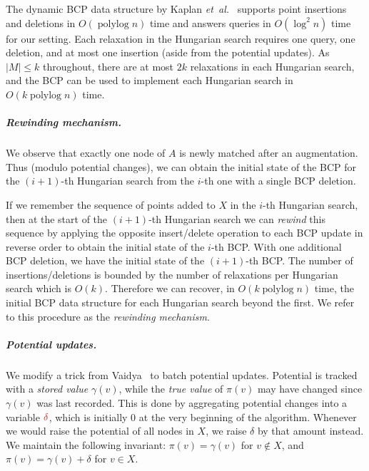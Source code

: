 \documentclass[a4paper,UKenglish]{socg-lipics-v2019}
\makeatletter
\def\etal{\emph{et~al.}}
\def\etal{\textit{et~al.}}
\def\polylog{\mathop{\mathrm{polylog}}}
\def\abs#1{\mathopen| #1 \mathclose|}		%
\theoremstyle{plain}
\numberwithin{figure}{section}
\renewcommand{\paragraph}{\subparagraph}
\def\EMPH#1{\textcolor{BrickRed}{{\emph{#1}}}}
\def\n@te#1{\textsf{\boldmath \textbf{$\langle\!\langle$#1$\rangle\!\rangle$}}\leavevmode}
\def\note#1{\textcolor{red}{\n@te{#1}}}
\makeatother
\begin{document}
The dynamic BCP data structure by Kaplan \etal~\cite{KMRSS17} supports point insertions and deletions in
$O(\polylog n)$ time and answers queries in $O(\log^2 n)$ time for our setting.
Each relaxation in the Hungarian search requires
one query, one deletion, and at most one insertion (aside from the potential updates).
As $\abs{M} \leq k$ throughout, there are at most $2k$ relaxations in each
Hungarian search, and the BCP can be used to implement each Hungarian search
in $O(k\polylog n)$ time.

\paragraph{Rewinding mechanism.}
We observe that exactly one node of $A$ is newly matched after an augmentation.
Thus (modulo potential changes), we can obtain the initial state of the BCP for
the $(i+1)$-th Hungarian search from the $i$-th one with a single BCP deletion.

If we remember the sequence of points added to $X$ in the $i$-th Hungarian search,
then at the start of the $(i+1)$-th Hungarian search we can \emph{rewind} this
sequence by applying the opposite insert/delete operation to each BCP update
in reverse order to obtain the initial state of the $i$-th BCP.
With one additional BCP deletion, we have the initial state of the $(i+1)$-th BCP.
The number of insertions/deletions is bounded by the number of
relaxations per Hungarian search which is $O(k)$.
Therefore we can recover, in $O(k\polylog n)$
time, the initial BCP data structure for each Hungarian search beyond the first.
We refer to this procedure as the \EMPH{rewinding mechanism}.


\paragraph{Potential updates.}
We modify a trick from Vaidya~\cite{Vaidya89} to batch potential updates.
Potential is tracked with a \EMPH{stored value} $\gamma(v)$, while the
\EMPH{true value} of $\pi(v)$ may have changed since $\gamma(v)$ was last recorded.
This is done by aggregating potential changes into a variable $\EMPH{$\delta$}$,
which is initially 0 at the very beginning of the algorithm.
Whenever we would raise the potential of all nodes in $X$, we raise
$\delta$ by that amount instead.
We maintain the following invariant: $\pi(v) = \gamma(v)$ for $v \not\in X$,
and $\pi(v) = \gamma(v) + \delta$ for $v \in X$.
\end{document}
